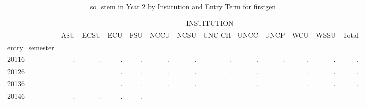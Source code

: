 \begin{table}[!h]
\caption{so\_stem in Year 2 by Institution and Entry Term for firstgen}
\centering
\begin{tabular}{lllllllllllll}
\cline{1-13}
\multicolumn{1}{c}{} &
  \multicolumn{12}{|c}{INSTITUTION} \\
\multicolumn{1}{c}{} &
  \multicolumn{1}{|r}{ASU} &
  \multicolumn{1}{r}{ECSU} &
  \multicolumn{1}{r}{ECU} &
  \multicolumn{1}{r}{FSU} &
  \multicolumn{1}{r}{NCCU} &
  \multicolumn{1}{r}{NCSU} &
  \multicolumn{1}{r}{UNC-CH} &
  \multicolumn{1}{r}{UNCC} &
  \multicolumn{1}{r}{UNCP} &
  \multicolumn{1}{r}{WCU} &
  \multicolumn{1}{r}{WSSU} &
  \multicolumn{1}{r}{Total} \\
\cline{1-13}
\multicolumn{1}{l}{entry\_semester} &
  \multicolumn{1}{|r}{} &
  \multicolumn{1}{r}{} &
  \multicolumn{1}{r}{} &
  \multicolumn{1}{r}{} &
  \multicolumn{1}{r}{} &
  \multicolumn{1}{r}{} &
  \multicolumn{1}{r}{} &
  \multicolumn{1}{r}{} &
  \multicolumn{1}{r}{} &
  \multicolumn{1}{r}{} &
  \multicolumn{1}{r}{} &
  \multicolumn{1}{r}{} \\
\multicolumn{1}{l}{\hspace{1em}20116} &
  \multicolumn{1}{|r}{.} &
  \multicolumn{1}{r}{.} &
  \multicolumn{1}{r}{.} &
  \multicolumn{1}{r}{.} &
  \multicolumn{1}{r}{.} &
  \multicolumn{1}{r}{.} &
  \multicolumn{1}{r}{.} &
  \multicolumn{1}{r}{.} &
  \multicolumn{1}{r}{.} &
  \multicolumn{1}{r}{.} &
  \multicolumn{1}{r}{.} &
  \multicolumn{1}{r}{.} \\
\multicolumn{1}{l}{\hspace{1em}20126} &
  \multicolumn{1}{|r}{.} &
  \multicolumn{1}{r}{.} &
  \multicolumn{1}{r}{.} &
  \multicolumn{1}{r}{.} &
  \multicolumn{1}{r}{.} &
  \multicolumn{1}{r}{.} &
  \multicolumn{1}{r}{.} &
  \multicolumn{1}{r}{.} &
  \multicolumn{1}{r}{.} &
  \multicolumn{1}{r}{.} &
  \multicolumn{1}{r}{.} &
  \multicolumn{1}{r}{.} \\
\multicolumn{1}{l}{\hspace{1em}20136} &
  \multicolumn{1}{|r}{.} &
  \multicolumn{1}{r}{.} &
  \multicolumn{1}{r}{.} &
  \multicolumn{1}{r}{.} &
  \multicolumn{1}{r}{.} &
  \multicolumn{1}{r}{.} &
  \multicolumn{1}{r}{.} &
  \multicolumn{1}{r}{.} &
  \multicolumn{1}{r}{.} &
  \multicolumn{1}{r}{.} &
  \multicolumn{1}{r}{.} &
  \multicolumn{1}{r}{.} \\
\multicolumn{1}{l}{\hspace{1em}20146} &
  \multicolumn{1}{|r}{.} &
  \multicolumn{1}{r}{.} &
  \multicolumn{1}{r}{.} &
  \multicolumn{1}{r}{.} &

\end{tabular}
\end{table}
